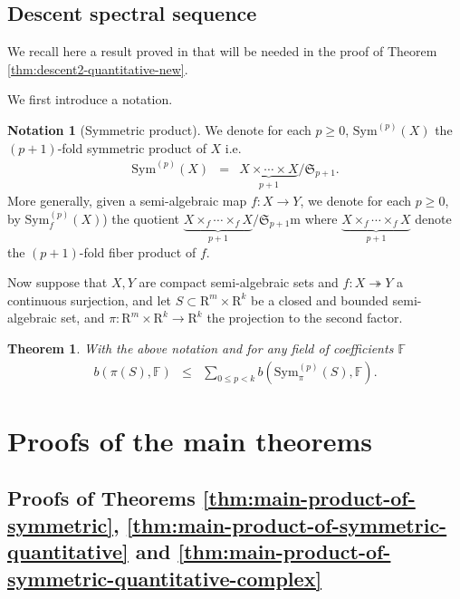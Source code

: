 \documentclass{amsart}
\newtheorem{theorem}{Theorem}
\theoremstyle{definition}
\newtheorem{notation}{Notation}
\theoremstyle{remark}
\numberwithin{equation}{section}
\begin{document}
\subsection{Descent spectral sequence}
\label{subsec:descent}
We recall here a result proved in \cite{BC2013} that will be needed in the proof of 
Theorem \ref{thm:descent2-quantitative-new}.

We first introduce a notation.

 \begin{notation}[Symmetric product]
  We denote for each $p \geq 0$, ${\mathrm{Sym}}^{(p)} (X
 )$ the $(p+1)$-fold symmetric product of $X$ i.e.
  \begin{eqnarray*}
    {\mathrm{Sym}}^{(p)} (X) & = & \underbrace{X \times\cdots \times X}_{p+1} /\mathfrak{S}_{p+1} .
  \end{eqnarray*}
More generally, given a semi-algebraic map $f:X \rightarrow Y$,
we denote for each $p \geq 0$, by  ${\mathrm{Sym}}^{(p)}_{f} (X)$) the
  quotient
  $\underbrace{X \times_{f} \cdots \times_{f} X}_{p+1} /\mathfrak{S}_{p+1}$m
  where $\underbrace{X \times_{f} \cdots \times_{f} X}_{p+1}$ denote the $(p+1)$-fold fiber
  product of $f$.
\end{notation}

Now suppose that $X,Y$ are compact semi-algebraic sets and $f:X\twoheadrightarrow Y$ a continuous surjection,
and let $S \subset {\mathrm{R}}^{m} \times {\mathrm{R}}^{k}$ be a closed and bounded semi-algebraic set, and 
$\pi:{\mathrm{R}}^{m} \times {\mathrm{R}}^{k} \rightarrow {\mathrm{R}}^{k}$ the projection to the second factor. 

\begin{theorem}\cite{BC2013}
  \label{thm:descent2} With the above notation and for any field of
  coefficients ${\mathbb{F}}$
  \begin{eqnarray*}
    b (\pi (S) ,{\mathbb{F}}) & \leq & \sum_{0 \leq p<k} b ({\mathrm{Sym}}^{(p)}_{\pi} (S) ,{\mathbb{F}}) .
  \end{eqnarray*}
\end{theorem}

\section{Proofs of the main theorems}
\label{sec:proofs-of-main}

\subsection{Proofs of Theorems \ref{thm:main-product-of-symmetric}, \ref{thm:main-product-of-symmetric-quantitative} and \ref{thm:main-product-of-symmetric-quantitative-complex}}
\end{document}
